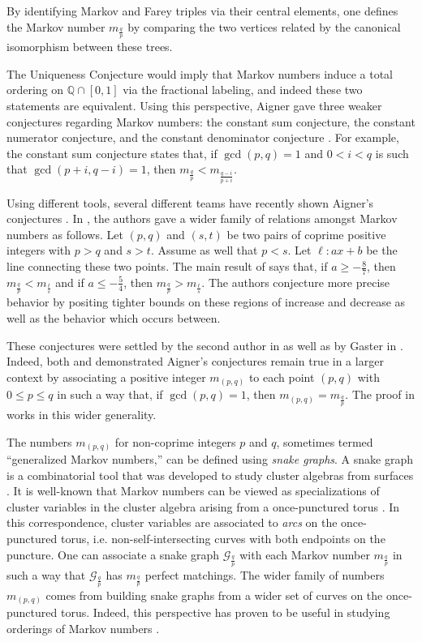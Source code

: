 \documentclass{article}
\theoremstyle{remark}
\newcommand{\fqp}{\frac{q}{p}}
\begin{document}
By identifying Markov and Farey triples via their central elements, one defines the Markov number $m_{\frac{q}{p}}$ by comparing the two vertices related by the canonical isomorphism between these trees. 

The Uniqueness Conjecture would imply that Markov numbers induce a total ordering on $\mathbb{Q} \cap [0,1]$ via the fractional labeling, and indeed these two statements are equivalent. Using this perspective, Aigner gave three weaker conjectures regarding Markov numbers: the constant sum conjecture, the constant numerator conjecture, and the constant denominator conjecture \cite{aigner2013Markov}. For example, the constant sum conjecture states that, if $\gcd(p,q) = 1$ and $0<i<q$ is such that $\gcd(p+i,q-i) = 1$, then $m_{\frac{q}{p}} < m_{\frac{q-i}{p+i}}$.

Using different tools, several different teams have recently shown Aigner's conjectures \cite{LPTV,LLRS,mcshane2021convexity}. In \cite{LLRS}, the authors gave a wider family of relations amongst Markov numbers as follows. Let $(p,q)$ and $(s,t)$ be two pairs of coprime positive integers with $p>q$ and $s>t$. Assume as well that $p < s$. Let $\ell: ax + b$ be the line connecting these two points. The main result of \cite{LLRS} says that, if $a \geq -\frac87$, then $m_{\frac{q}{p}} < m_{\frac{t}{s}}$ and if $a \leq -\frac54$, then $m_{\frac{q}{p}} > m_{\frac{t}{s}}$. The authors conjecture more precise behavior by positing tighter bounds on these regions of increase and decrease as well as the behavior which occurs between. 

These conjectures were settled by the second author in \cite{HuangMonotonicity} as well as by Gaster in \cite{Gaster}. Indeed, both \cite{LPTV} and \cite{LLRS} demonstrated Aigner's conjectures remain true in a larger context by associating a positive integer $m_{(p,q)}$ to each point $(p,q)$ with $0 \leq p \leq q$ in such a way that, if $\gcd(p,q) = 1$, then $m_{(p,q)} = m_\fqp$. The proof in \cite{HuangMonotonicity} works in this wider generality.

The numbers $m_{(p,q)}$ for non-coprime integers $p$ and $q$, sometimes termed ``generalized Markov numbers,'' can be defined using \emph{snake graphs}. A snake graph is a combinatorial tool that was developed to study cluster algebras from surfaces \cite{MusikerSchiffler1,propp2005combinatorics}. It is well-known that Markov numbers can be viewed as specializations of cluster variables in the cluster algebra arising from a once-punctured torus \cite{beineke2011cluster,propp2005combinatorics}. In this correspondence, cluster variables are associated to \emph{arcs} on the once-punctured torus, i.e. non-self-intersecting curves with both endpoints on the puncture. One can associate a snake graph $\mathcal{G}_{\fqp}$ with each Markov number $m_{\fqp}$ in such a way that $\mathcal{G}_{\fqp}$ has $m_{\fqp}$ perfect matchings. The wider family of numbers $m_{(p,q)}$ comes from building snake graphs from a wider set of curves on the once-punctured torus. Indeed, this perspective has proven to be useful in studying orderings of Markov numbers \cite{rabideau2020continued,LLRS}.
\end{document}
